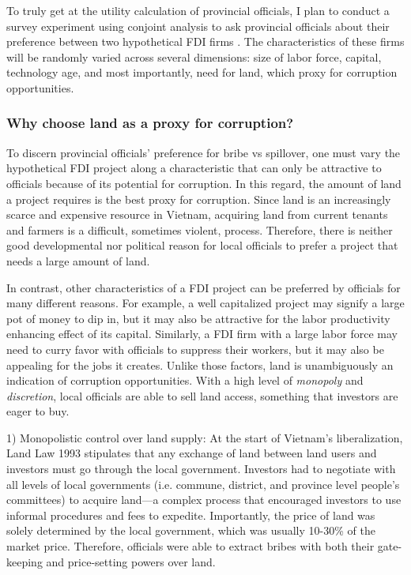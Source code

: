 To truly get at the utility calculation of provincial officials, I plan to conduct a survey experiment using conjoint analysis to ask provincial officials about their preference between two hypothetical FDI firms \citep{Hainmueller2014}. The characteristics of these firms will be randomly varied across several dimensions: size of labor force, capital, technology age, and most importantly, need for land, which proxy for corruption opportunities.

\subsubsection{Why choose land as a proxy for corruption?}

To discern provincial officials' preference for bribe vs spillover, one must vary the hypothetical FDI project along a characteristic that can only be attractive to officials because of its potential for corruption. In this regard, the amount of land a project requires is the best proxy for corruption. Since land is an increasingly scarce and expensive resource in Vietnam, acquiring land from current tenants and farmers is a difficult, sometimes violent, process. Therefore, there is neither good developmental nor political reason for local officials to prefer a project that needs a large amount of land. 

In contrast, other characteristics of a FDI project can be preferred by officials for many different reasons. For example, a well capitalized project may signify a large pot of money to dip in, but it may also be attractive for the labor productivity enhancing effect of its capital. Similarly, a FDI firm with a large labor force may need to curry favor with officials to suppress their workers, but it may also be appealing for the jobs it creates.  Unlike those factors, land is unambiguously an indication of corruption opportunities. With a high level of \textit{monopoly} and \textit{discretion}, local officials are able to sell land access, something that investors are eager to buy.

1) Monopolistic control over land supply: At the start of Vietnam's liberalization, Land Law 1993 stipulates that any exchange of land between land users and investors must go through the local government. Investors had to negotiate with all levels of local governments (i.e. commune, district, and province level people's committees) to acquire land---a complex process that encouraged investors to use informal procedures and fees to expedite. Importantly, the price of land was solely determined by the local government, which was usually 10-30\% of the market price. Therefore, officials were able to extract bribes with both their gate-keeping and price-setting powers over land.

